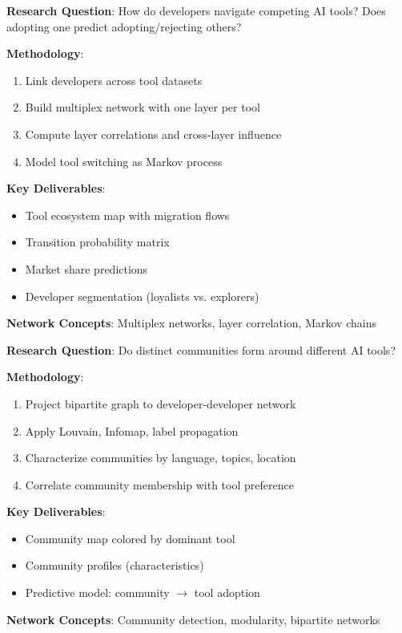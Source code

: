 \documentclass[11pt,letterpaper]{article}
\begin{document}
\begin{tcolorbox}[colback=blue!5,colframe=blue!50!black,title=Project 2B: Multi-Tool Ecosystem as Multiplex Network]
\textbf{Research Question}: How do developers navigate competing AI tools? Does adopting one predict adopting/rejecting others?

\textbf{Methodology}:
\begin{enumerate}
    \item Link developers across tool datasets
    \item Build multiplex network with one layer per tool
    \item Compute layer correlations and cross-layer influence
    \item Model tool switching as Markov process
\end{enumerate}

\textbf{Key Deliverables}:
\begin{itemize}
    \item Tool ecosystem map with migration flows
    \item Transition probability matrix
    \item Market share predictions
    \item Developer segmentation (loyalists vs. explorers)
\end{itemize}

\textbf{Network Concepts}: Multiplex networks, layer correlation, Markov chains
\end{tcolorbox}

\begin{tcolorbox}[colback=blue!5,colframe=blue!50!black,title=Project 2C: Community Detection and Tool Preference Clustering]
\textbf{Research Question}: Do distinct communities form around different AI tools?

\textbf{Methodology}:
\begin{enumerate}
    \item Project bipartite graph to developer-developer network
    \item Apply Louvain, Infomap, label propagation
    \item Characterize communities by language, topics, location
    \item Correlate community membership with tool preference
\end{enumerate}

\textbf{Key Deliverables}:
\begin{itemize}
    \item Community map colored by dominant tool
    \item Community profiles (characteristics)
    \item Predictive model: community $\rightarrow$ tool adoption
\end{itemize}

\textbf{Network Concepts}: Community detection, modularity, bipartite networks
\end{tcolorbox}
\end{document}
